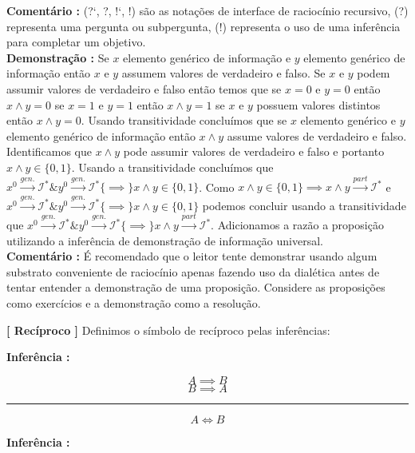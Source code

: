 \documentclass[10pt,a4paper]{report}
\begin{document}
\textbf{Comentário :} (?`, ?, !`, !) são as notações de interface de raciocínio recursivo, (?) representa uma pergunta ou subpergunta, (!) representa o uso de uma inferência para completar um objetivo.\\

\textbf{Demonstração :} Se $x$ elemento genérico de informação e $y$ elemento genérico de informação então $x$ e $y$ assumem valores de verdadeiro e falso. Se $x$ e $y$ podem assumir valores de verdadeiro e falso então temos que se $x=0$ e $y=0$ então $x\wedge y = 0$ se $x=1$ e $y=1$ então $x \wedge y =1$ se $x$ e $y$ possuem valores distintos então $x \wedge y=0$. Usando transitividade concluímos que se $x$ elemento genérico e $y$ elemento genérico de informação então $x\wedge y$ assume valores de verdadeiro e falso. Identificamos que $x\wedge y$ pode assumir valores de verdadeiro e falso e portanto $x \wedge y \in \{0,1\} $. Usando a transitividade concluímos que $x^0 \overset{gen.}{\rightarrow} \mathcal{I}^* \& y^0 \overset{gen.}{\rightarrow} \mathcal{I}^* \{ \implies \} x\wedge y \in \{0,1\}$. Como $x\wedge y \in \{0,1\} \implies x \wedge y \overset{part}{\rightarrow} \mathcal{I}^*$ e $x^0 \overset{gen.}{\rightarrow} \mathcal{I}^* \& y^0 \overset{gen.}{\rightarrow} \mathcal{I}^* \{ \implies \} x\wedge y \in \{0,1\}$ podemos concluir usando a transitividade que $x^0 \overset{gen.}{\rightarrow} \mathcal{I}^* \& y^0 \overset{gen.}{\rightarrow} \mathcal{I}^* \{ \implies \} x\wedge y \overset{part}{\rightarrow} \mathcal{I}^*$. Adicionamos a razão a proposição utilizando a inferência de demonstração de informação universal.\\

\textbf{Comentário :} É recomendado que o leitor tente demonstrar usando algum substrato conveniente de raciocínio apenas fazendo uso da dialética antes de tentar entender a demonstração de uma proposição. Considere as proposições como exercícios e a demonstração como a resolução.

\hspace{\baselineskip}

\textbf{[ Recíproco ]} Definimos o símbolo de recíproco pelas inferências:

\textbf{Inferência :}

$$ A \implies B $$
$$ B \implies A $$
\hrule
$$ A \iff B $$

\textbf{Inferência :}
\end{document}
